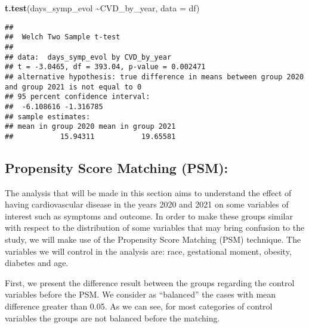 \documentclass[
]{article}
\newenvironment{Shaded}{\begin{snugshade}}{\end{snugshade}}
\newcommand{\AttributeTok}[1]{\textcolor[rgb]{0.13,0.29,0.53}{#1}}
\newcommand{\DecValTok}[1]{\textcolor[rgb]{0.00,0.00,0.81}{#1}}
\newcommand{\FunctionTok}[1]{\textcolor[rgb]{0.13,0.29,0.53}{\textbf{#1}}}
\newcommand{\NormalTok}[1]{#1}
\newcommand{\OtherTok}[1]{\textcolor[rgb]{0.56,0.35,0.01}{#1}}
\newcommand{\SpecialCharTok}[1]{\textcolor[rgb]{0.81,0.36,0.00}{\textbf{#1}}}
\newcommand{\StringTok}[1]{\textcolor[rgb]{0.31,0.60,0.02}{#1}}
\begin{document}
\begin{Shaded}
\begin{Highlighting}[]
\FunctionTok{t.test}\NormalTok{(days\_symp\_evol }\SpecialCharTok{\textasciitilde{}}\NormalTok{CVD\_by\_year, }\AttributeTok{data =}\NormalTok{ df)}
\end{Highlighting}
\end{Shaded}

\begin{verbatim}
## 
##  Welch Two Sample t-test
## 
## data:  days_symp_evol by CVD_by_year
## t = -3.0465, df = 393.04, p-value = 0.002471
## alternative hypothesis: true difference in means between group 2020 and group 2021 is not equal to 0
## 95 percent confidence interval:
##  -6.108616 -1.316785
## sample estimates:
## mean in group 2020 mean in group 2021 
##           15.94311           19.65581
\end{verbatim}

\hypertarget{propensity-score-matching-psm}{%
\subsection{Propensity Score Matching
(PSM):}\label{propensity-score-matching-psm}}

The analysis that will be made in this section aims to understand the
effect of having cardiovascular disease in the years 2020 and 2021 on
some variables of interest such as symptoms and outcome. In order to
make these groups similar with respect to the distribution of some
variables that may bring confusion to the study, we will make use of the
Propensity Score Matching (PSM) technique. The variables we will control
in the analysis are: race, gestational moment, obesity, diabetes and
age.

First, we present the difference result between the groups regarding the
control variables before the PSM. We consider as ``balanced'' the cases
with mean difference greater than 0.05. As we can see, for most
categories of control variables the groups are not balanced before the
matching.

\begin{Shaded}
\end{Shaded}
\end{document}
